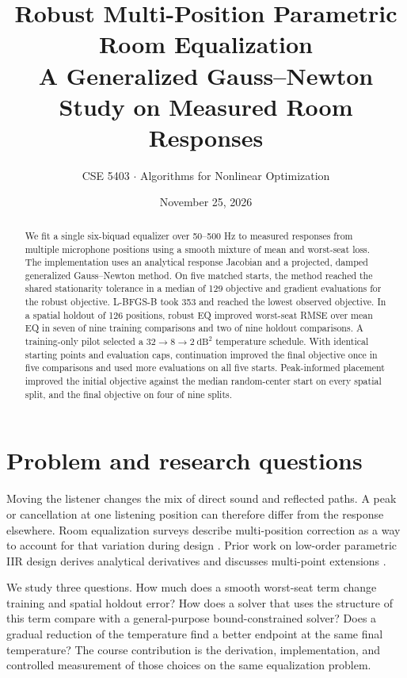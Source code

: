 \documentclass[11pt,letterpaper]{article}
\title{\textbf{Robust Multi-Position Parametric Room Equalization}\\[4pt]
  \large A Generalized Gauss--Newton Study on Measured Room Responses}
\author{CSE 5403 \enspace $\cdot$ \enspace Algorithms for Nonlinear Optimization}
\date{November 25, 2026}
\newcommand{\loss}{\mathrm{dB}^2}
\begin{document}
\maketitle

\begin{abstract}
We fit a single six-biquad equalizer over 50--500 Hz to measured responses from
multiple microphone positions using a smooth mixture of mean and worst-seat
loss. The implementation uses an analytical response Jacobian and a projected,
damped generalized Gauss--Newton method. On five matched starts, the method
reached the shared stationarity tolerance in a median of 129 objective and
gradient evaluations for the robust objective. L-BFGS-B took 353 and reached
the lowest observed objective. In a spatial holdout of 126 positions, robust
EQ improved worst-seat RMSE over mean EQ in seven of nine training comparisons
and two of nine holdout comparisons. A training-only pilot selected a
$32\rightarrow8\rightarrow2~\loss$ temperature schedule. With identical
starting points and evaluation caps, continuation improved the final objective
once in five comparisons and used more evaluations on all five starts.
Peak-informed placement improved the initial objective against the median
random-center start on every spatial split, and the final objective on four
of nine splits.
\end{abstract}

\section{Problem and research questions}
Moving the listener changes the mix of direct sound and reflected paths.
A peak or cancellation at one listening position can therefore differ from the
response elsewhere. Room equalization surveys describe multi-position
correction as a way to account for that variation during design \cite{cecchi}.
Prior work on low-order parametric IIR design derives analytical derivatives
and discusses multi-point extensions \cite{vairetti}.

We study three questions. How much does a smooth worst-seat term change
training and spatial holdout error? How does a solver that uses the structure
of this term compare with a general-purpose bound-constrained solver? Does a
gradual reduction of the temperature find a better endpoint at the same final
temperature? The course contribution is the derivation, implementation, and
controlled measurement of those choices on the same equalization problem.
\end{document}
